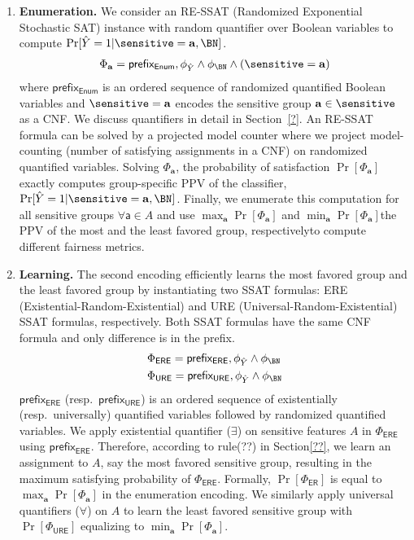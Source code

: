 \begin{enumerate}
	\item \textbf{Enumeration.} We consider an RE-SSAT (Randomized Exponential Stochastic SAT) instance with random quantifier over Boolean variables to compute $ \Pr[\hat{Y} = 1 | \sensitive = \mathbf{a}, \BN] $. 
	\begin{align}
	\Phi_{\mathbf{a}} = \mathsf{prefix_{Enum}}, \phi_{\hat{Y}} \wedge \phi_\BN \wedge (\sensitive = \mathbf{a})
	\end{align}
	where $ \mathsf{prefix_{Enum}} $ is an ordered sequence of randomized quantified Boolean variables and $ \sensitive = \mathbf{a} $ encodes the sensitive group $ \mathbf{a} \in \sensitive $ as a CNF. We discuss quantifiers in detail in Section~\ref{?}. An RE-SSAT formula can be solved by a projected model counter where we project model-counting (number of satisfying assignments in a CNF) on randomized quantified variables. Solving $ \Phi_{\mathbf{a}} $,  the probability of satisfaction $ \Pr[\Phi_{\mathbf{a}}] $ exactly computes group-specific PPV of the classifier, $ \Pr[\hat{Y} = 1 | \sensitive = \mathbf{a}, \BN] $. Finally, we enumerate this computation for all sensitive groups $ \forall \mathsf{a} \in A $ and use  $ \max_{\mathbf{a}} \Pr[\Phi_{\mathbf{a}}] $  and $ \min_{\mathbf{a}} \Pr[\Phi_{\mathbf{a}}] $\textemdash the PPV of the most and the least favored group, respectively\textemdash  to compute different fairness metrics. 
	
	
	\item \textbf{Learning.} The second encoding efficiently learns the most favored group and the least favored group by instantiating two SSAT formulas: ERE (Existential-Random-Existential) and URE (Universal-Random-Existential) SSAT formulas, respectively. Both SSAT formulas have the same CNF formula and only difference is in the prefix. 
	\begin{align}
	&\Phi_\mathsf{ERE} = \mathsf{prefix_{ERE}}, \phi_{\hat{Y}} \wedge \phi_\BN\\
	&\Phi_\mathsf{URE} = \mathsf{prefix_{URE}}, \phi_{\hat{Y}} \wedge \phi_\BN
	\end{align}
	$ \mathsf{prefix_{ERE}} $ (resp.\ $ \mathsf{prefix_{URE}} $) is an ordered sequence of existentially (resp.\ universally) quantified variables followed by randomized quantified variables.
	We apply existential quantifier ($ \exists $) on sensitive features $ A $ in $ \Phi_\mathsf{ERE} $ using $ \mathsf{prefix_{ERE}} $. Therefore, according to rule(??) in Section\ref{??}, we learn an assignment to $ A $, say the most favored sensitive group,  resulting in the maximum satisfying probability of $ \Phi_\mathsf{ERE} $. Formally, $ \Pr[\Phi_\mathsf{ER}] $ is equal to $ \max_{\mathbf{a}} \Pr[\Phi_{\mathbf{a}}] $ in the enumeration encoding. We similarly apply universal quantifiers ($ \forall $) on $ A $ to learn the least favored sensitive group with $ \Pr[\Phi_\mathsf{URE}] $ equalizing to $ \min_{\mathbf{a}} \Pr[\Phi_{\mathbf{a}}] $. 
\end{enumerate}

